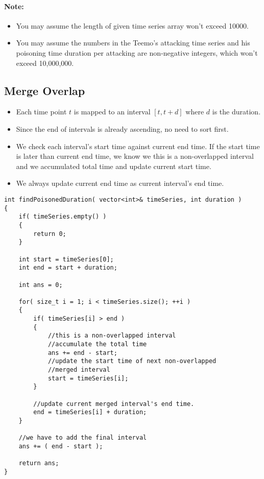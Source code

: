 \paragraph{Note:}

\begin{itemize}
\item You may assume the length of given time series array won't exceed 10000.
\item You may assume the numbers in the Teemo's attacking time series and his poisoning time duration per attacking are non-negative integers, which won't exceed 10,000,000.
\end{itemize}

\subsection{Merge Overlap}
\begin{itemize}
\item Each time point $t$ is mapped to an interval $[t, t+d]$ where $d$ is the duration.
\item Since the end of intervals is already ascending, no need to sort first.
\item We check each interval's start time against current end time. If the start time is later than current end time, we know we this is a non-overlapped interval and we accumulated total time and update current start time.
\item We always update current end time as current interval's end time.
\end{itemize}

\setcounter{lstlisting}{0}
\begin{lstlisting}[style=customc, caption={Merge Interval}]
int findPoisonedDuration( vector<int>& timeSeries, int duration )
{
    if( timeSeries.empty() )
    {
        return 0;
    }

    int start = timeSeries[0];
    int end = start + duration;

    int ans = 0;

    for( size_t i = 1; i < timeSeries.size(); ++i )
    {
        if( timeSeries[i] > end )
        {
            //this is a non-overlapped interval
            //accumulate the total time
            ans += end - start;
            //update the start time of next non-overlapped
            //merged interval
            start = timeSeries[i];
        }

        //update current merged interval's end time.
        end = timeSeries[i] + duration;
    }

    //we have to add the final interval
    ans += ( end - start );

    return ans;
}
\end{lstlisting}